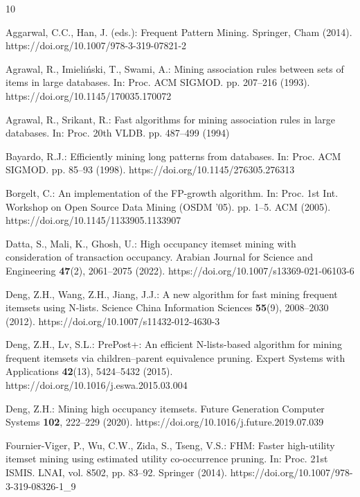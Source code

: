 \documentclass[runningheads,orivec]{llncs}
\begin{document}

\begin{thebibliography}{10}
\providecommand{\url}[1]{\texttt{#1}}
\providecommand{\urlprefix}{URL }
\providecommand{\doi}[1]{https://doi.org/#1}

Aggarwal, C.C., Han, J. (eds.): Frequent Pattern Mining. Springer, Cham (2014). \doi{10.1007/978-3-319-07821-2}

Agrawal, R., Imieli{\'n}ski, T., Swami, A.: Mining association rules between sets of items in large databases. In: Proc. ACM SIGMOD. pp. 207--216 (1993). \doi{10.1145/170035.170072}

Agrawal, R., Srikant, R.: Fast algorithms for mining association rules in large databases. In: Proc. 20th VLDB. pp. 487--499 (1994)

Bayardo, R.J.: Efficiently mining long patterns from databases. In: Proc. ACM SIGMOD. pp. 85--93 (1998). \doi{10.1145/276305.276313}

Borgelt, C.: An implementation of the FP-growth algorithm. In: Proc. 1st Int. Workshop on Open Source Data Mining (OSDM '05). pp. 1--5. ACM (2005). \doi{10.1145/1133905.1133907}

Datta, S., Mali, K., Ghosh, U.: High occupancy itemset mining with consideration of transaction occupancy. Arabian Journal for Science and Engineering \textbf{47}(2), 2061--2075 (2022). \doi{10.1007/s13369-021-06103-6}

Deng, Z.H., Wang, Z.H., Jiang, J.J.: A new algorithm for fast mining frequent itemsets using N-lists. Science China Information Sciences \textbf{55}(9), 2008--2030 (2012). \doi{10.1007/s11432-012-4630-3}

Deng, Z.H., Lv, S.L.: PrePost+: An efficient N-lists-based algorithm for mining frequent itemsets via children--parent equivalence pruning. Expert Systems with Applications \textbf{42}(13), 5424--5432 (2015). \doi{10.1016/j.eswa.2015.03.004}

Deng, Z.H.: Mining high occupancy itemsets. Future Generation Computer Systems \textbf{102}, 222--229 (2020). \doi{10.1016/j.future.2019.07.039}

Fournier-Viger, P., Wu, C.W., Zida, S., Tseng, V.S.: FHM: Faster high-utility itemset mining using estimated utility co-occurrence pruning. In: Proc. 21st ISMIS. LNAI, vol. 8502, pp. 83--92. Springer (2014). \doi{10.1007/978-3-319-08326-1_9}


\end{thebibliography}
\end{document}
